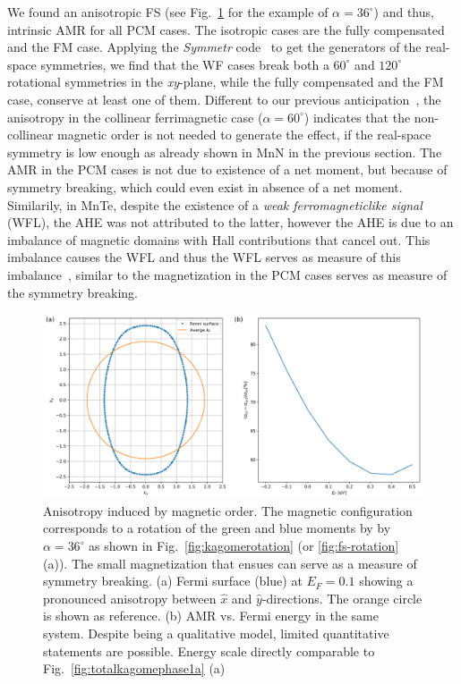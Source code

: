 \documentclass[prb,showpacs,amsmath,amssymb,superscriptaddress,twocolumn,floatfix]{revtex4-1}
\begin{document}
We found an anisotropic FS (see Fig.~\ref{fig:asymmFS} for the example of $\alpha = 36^\circ$) and thus, intrinsic AMR for all {\color{blue} PCM} cases. The isotropic cases are the fully compensated and the FM case. Applying the \textit{Symmetr} code~\cite{Symmetr} to get the generators of the real-space symmetries, we find that the WF cases break both a $60^\circ$ and $120^\circ$ rotational symmetries in the \textit{xy}-plane, while the fully compensated and the FM case, conserve at least one of them. 
Different to our previous anticipation~\cite{Ritzinger:2023}, the anisotropy in the collinear ferrimagnetic case ($\alpha = 60^\circ$) indicates that the non-collinear magnetic order is not needed to generate the effect, if the real-space symmetry is low enough {\color{blue} as already shown in MnN in the previous section. The AMR in the PCM cases is not due to existence of a net moment, but because of symmetry breaking, which could even exist in absence of a net moment. Similarily, in MnTe, despite the existence of a \textit{weak ferromagneticlike signal} (WFL), the AHE was not attributed to the latter, } however the AHE is due to an imbalance of magnetic domains with Hall contributions that cancel out. This imbalance causes the WFL and thus the WFL serves as measure of this imbalance~\cite{Kluczyk:2024}, similar to {\color{blue} the magnetization in the PCM cases serves} as measure of the symmetry breaking.

\begin{figure}
	\centering
	\includegraphics[width=\linewidth]{img/fig4_new}
	\caption{Anisotropy induced by magnetic order. The magnetic configuration corresponds to a rotation of the green and blue moments by by~$\alpha = 36^\circ$ as shown in Fig.~\ref{fig:kagomerotation} (or \ref{fig:fs-rotation} (a)). The small magnetization that ensues can serve as a measure of symmetry breaking. 		
		(a) Fermi surface (blue) at $E_F = 0.1$ showing a pronounced anisotropy between $\hat{x}$ and $\hat{y}$-directions. The orange circle is shown as reference.	
		(b) AMR vs. Fermi energy in the same system. Despite being a qualitative model, limited quantitative statements are possible. Energy scale directly comparable to Fig.~\ref{fig:totalkagomephase1a} (a)}
	\label{fig:asymmFS}
\end{figure}
\end{document}
